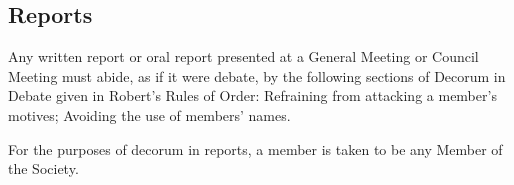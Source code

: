 \subsection{Reports}
\begin{longenum}[ label*=\thesubsection.\arabic*., align=left]
	\item Any written report or oral report presented at a General Meeting or Council Meeting must abide, as if it were debate, by the following sections of Decorum in Debate given in Robert's Rules of Order: Refraining from attacking a member's motives; Avoiding the use of members' names. 
    \begin{longenum}[ label*=\arabic*., align=left]
		\item For the purposes of decorum in reports, a member is taken to be any Member of the Society.
	\end{longenum}
\end{longenum}
